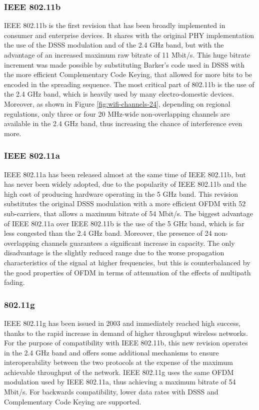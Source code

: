 \subsubsection{IEEE 802.11b}

IEEE 802.11b is the first revision that has been broadly implemented in consumer and enterprise devices. It shares with the original PHY implementation the use of the \gls{DSSS} modulation and of the 2.4 GHz band, but with the advantage of an increased maximum raw bitrate of 11 Mbit/s. This huge bitrate increment was made possible by substituting Barker's code used in \gls{DSSS} with the more efficient Complementary Code Keying, that allowed for more bits to be encoded in the spreading sequence. The most critical part of 802.11b is the use of the 2.4 GHz band, which is heavily used by many electro-domestic devices. Moreover, as shown in Figure \ref{fig:wifi-channels-24}, depending on regional regulations, only three or four 20 MHz-wide non-overlapping channels are available in the 2.4 GHz band, thus increasing the chance of interference even more.

\subsubsection{IEEE 802.11a}

IEEE 802.11a has been released almost at the same time of IEEE 802.11b, but has never been widely adopted, due to the popularity of IEEE 802.11b and the high cost of producing hardware operating in the 5 GHz band. This revision substitutes the original \gls{DSSS} modulation with a more efficient \gls{OFDM} with 52 sub-carriers, that allows a maximum bitrate of 54 Mbit/s. The biggest advantage of IEEE 802.11a over IEEE 802.11b is the use of the 5 GHz band, which is far less congested than the 2.4 GHz band. Moreover, the presence of 24 non-overlapping channels guarantees a significant increase in capacity. The only disadvantage is the slightly reduced range due to the worse propagation characteristics of the signal at higher frequencies, but this is counterbalanced by the good properties of \gls{OFDM} in terms of attenuation of the effects of multipath fading.

\subsubsection{802.11g}

IEEE 802.11g has been issued in 2003 and immediately reached high success, thanks to the rapid increase in demand of higher throughput wireless networks. For the purpose of compatibility with IEEE 802.11b, this new revision operates in the 2.4 GHz band and offers some additional mechanisms to ensure interoperability between the two protocols at the expense of the maximum achievable throughput of the network. IEEE 802.11g uses the same \gls{OFDM} modulation used by IEEE 802.11a, thus achieving a maximum bitrate of 54 Mbit/s. For backwards compatibility, lower data rates with \gls{DSSS} and Complementary Code Keying are supported.

